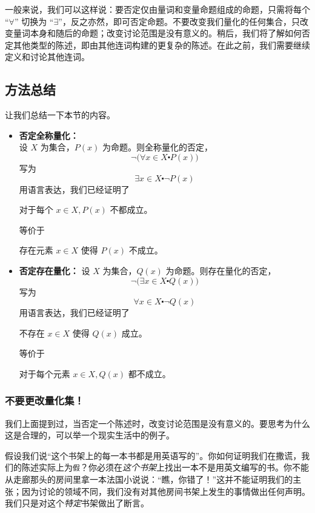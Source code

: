 一般来说，我们可以这样说：要否定仅由量词和变量命题组成的命题，只需将每个 ``$\forall$'' 切换为 ``$\exists$''，反之亦然，即可否定命题。不要改变我们量化的任何集合，只改变量词本身和随后的命题；改变讨论范围是没有意义的。稍后，我们将了解如何否定其他类型的陈述，即由其他连词构建的更复杂的陈述。在此之前，我们需要继续定义和讨论其他连词。

\subsection{方法总结}

让我们总结一下本节的内容。
\begin{itemize}
    \item \textbf{否定全称量化：} \\
        设 $X$ 为集合，$P(x)$ 为命题。则全称量化的否定，
        \[\neg \big(\forall x \in X \centerdot P(x)\big)\]
        写为
        \[\exists x \in X \centerdot \neg P(x)\]
        用语言表达，我们已经证明了
        \begin{center}
            对于每个 $x \in X, P(x)$ 不都成立。
        \end{center}
        等价于
        \begin{center}
            存在元素 $x \in X$ 使得 $P(x)$ 不成立。
        \end{center}
    \item \textbf{否定存在量化：}
        设 $X$ 为集合，$Q(x)$ 为命题。则存在量化的否定，
        \[\neg \big(\exists x \in X \centerdot Q(x)\big)\]
        写为
        \[\forall x \in X \centerdot \neg Q(x)\]
        用语言表达，我们已经证明了
        \begin{center}
            不存在 $x \in X$ 使得 $Q(x)$ 成立。
        \end{center}
        等价于
        \begin{center}
            对于每个元素 $x \in X, Q(x)$ 都不成立。
        \end{center}
\end{itemize}

\subsubsection*{不要更改量化集！}

我们上面提到过，当否定一个陈述时，改变讨论范围是没有意义的。要思考为什么这是合理的，可以举一个现实生活中的例子。

假设我们说``这个书架上的每一本书都是用英语写的''。你如何证明我们在撒谎，我们的陈述实际上为\verb|假|？你必须在\emph{这个书架}上找出一本不是用英文编写的书。你不能从走廊那头的房间里拿一本法国小说说：``瞧，你错了！''这并不能证明我们的主张；因为讨论的领域不同，我们没有对其他房间书架上发生的事情做出任何声明。我们只是对这个\emph{特定}书架做出了断言。

